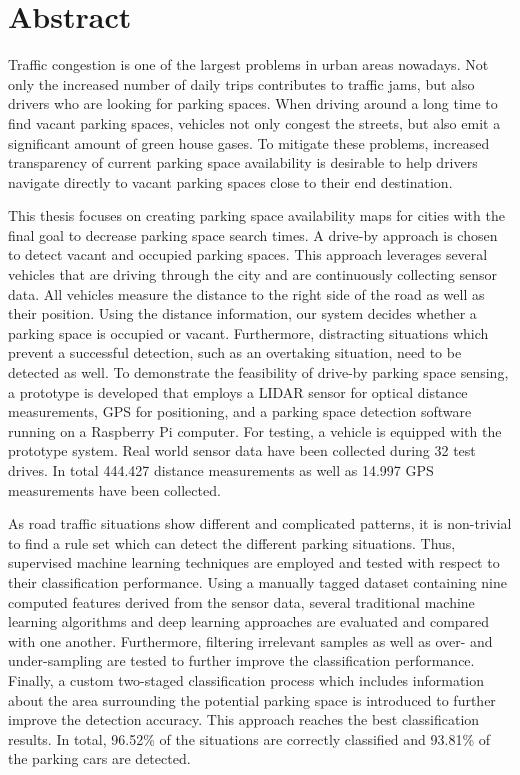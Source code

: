 

\chapter*{Abstract}

Traffic congestion is one of the largest problems in urban areas nowadays. Not only the increased number of daily trips contributes to traffic jams, but also drivers who are looking for parking spaces. When driving around a long time to find vacant parking spaces, vehicles not only congest the streets, but also emit a significant amount of green house gases. To mitigate these problems, increased transparency of current parking space availability is desirable to help drivers navigate directly to vacant parking spaces close to their end destination. 

This thesis focuses on creating parking space availability maps for cities with the final goal to decrease parking space search times. A drive-by approach is chosen to detect vacant and occupied parking spaces. This approach leverages several vehicles that are driving through the city and are continuously collecting sensor data. All vehicles measure the distance to the right side of the road as well as their position. Using the distance information, our system decides whether a parking space is occupied or vacant. Furthermore, distracting situations which prevent a successful detection, such as an overtaking situation, need to be detected as well. 
To demonstrate the feasibility of drive-by parking space sensing, a prototype is developed that employs a LIDAR sensor for optical distance measurements, GPS for positioning, and a parking space detection software running on a Raspberry Pi computer.
For testing, a vehicle is equipped with the prototype system. Real world sensor data have been collected during 32 test drives. In total 444.427 distance measurements as well as 14.997 GPS measurements have been collected.

As road traffic situations show different and complicated patterns, it is non-trivial to find a rule set which can detect the different parking situations. Thus, supervised machine learning techniques are employed and tested with respect to their classification performance. Using a manually tagged dataset containing nine computed features derived from the sensor data, several traditional machine learning algorithms and deep learning approaches are evaluated and compared with one another. Furthermore, filtering irrelevant samples as well as over- and under-sampling are tested to further improve the classification performance. 
Finally, a custom two-staged classification process which includes information about the area surrounding the potential parking space is introduced to further improve the detection accuracy. This approach reaches the best classification results. In total, 96.52\% of the situations are correctly classified and 93.81\% of the parking cars are detected.



